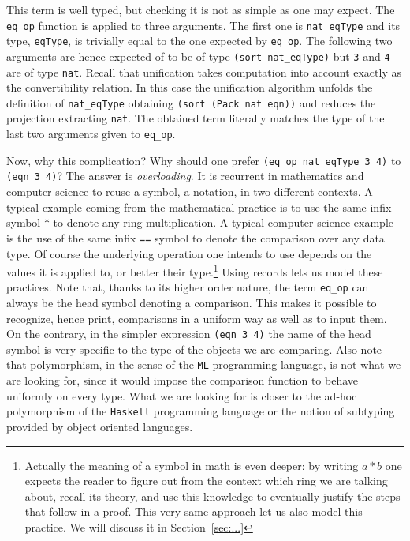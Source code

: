 This term is well typed, but checking it is not as simple as one may
expect.
The \lstinline/eq_op/ function is applied to three arguments.
The first one is \lstinline/nat_eqType/ and its type,
\lstinline/eqType/, is trivially equal to the one expected by
\lstinline/eq_op/.
The following two arguments are hence expected of to be of type
\lstinline/(sort nat_eqType)/ but \lstinline/3/ and \lstinline/4/ are
of type \lstinline/nat/.
Recall that unification takes computation into account exactly as the
convertibility relation.  In this case the unification algorithm
unfolds the definition of \lstinline/nat_eqType/ obtaining
\lstinline/(sort (Pack nat eqn))/ and reduces the projection
extracting  \lstinline/nat/.  The obtained term literally matches the
type of the last two arguments given to \lstinline/eq_op/.

Now, why this complication?  Why should one prefer
\lstinline/(eq_op nat_eqType 3 4)/ to \lstinline/(eqn 3 4)/?
The answer is \emph{overloading}.
It is recurrent in mathematics and computer science to reuse
a symbol, a notation, in two different contexts.  A typical
example coming from the mathematical practice is to use the same
infix symbol $*$ to denote any ring multiplication.  A typical
computer science example is the use of the same infix
\lstinline/==/ symbol to denote the comparison over any data type.
Of course the underlying operation one intends to use depends on
the values it is applied to, or better their type.\footnote{
Actually the meaning of a symbol in math is even deeper: by writing $a
* b$ one expects the reader to figure out from the context which ring
we are talking about, recall its theory, and use this knowledge to
eventually justify the steps that follow in a proof.  This very
same approach let us also model this practice.  We will discuss
it in Section~\ref{sec:...}}
Using records lets us model these practices.
Note that, thanks to its higher order nature, the term \lstinline/eq_op/
can always be the head symbol denoting a comparison.  This makes
it possible to recognize, hence print, comparisons in a uniform way
as well as to input them.  On the contrary, in the simpler expression
\lstinline/(eqn 3 4)/ the name of the head symbol is very specific to
the type of the objects we are comparing.  Also note that
polymorphism, in the sense of the \lstinline/ML/ programming language,
is not what we are looking for, since it would impose the comparison
function to behave uniformly on every type.  What we are looking
for is closer to the ad-hoc polymorphism of the \lstinline/Haskell/
programming language or the notion of subtyping provided by object
oriented languages.

